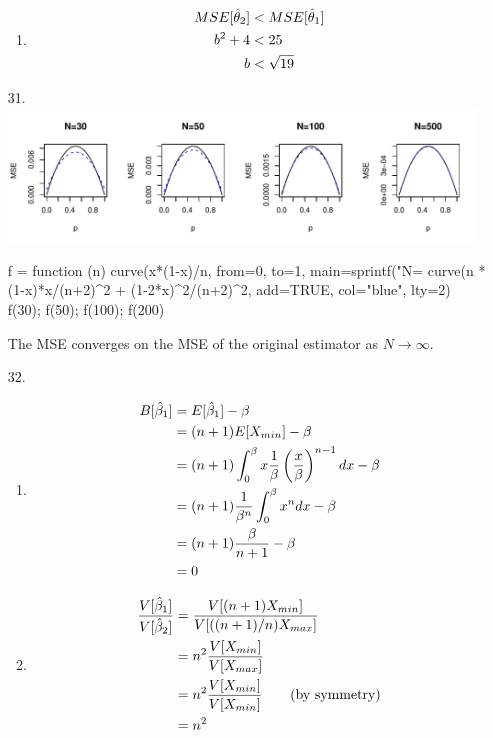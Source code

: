\documentclass{article}
\begin{document}
\begin{enumerate}
\begin{enumerate}
\item
\begin{align}
	MSE[\hat\theta_2] &< MSE[\hat\theta_1]
	\notag\\
	b^2 + 4 &< 25
	\notag\\
	b &< \sqrt{19}
	\notag
\end{align}
\end{enumerate}


\newpage
\item[31.]\hspace{0em}\\
\includegraphics[width=0.98\textwidth]{6-31.pdf}
\begin{code}
f = function (n) {
  curve(x*(1-x)/n, from=0, to=1, main=sprintf("N=%
  curve(n * (1-x)*x/(n+2)^2 + (1-2*x)^2/(n+2)^2, add=TRUE, col="blue", lty=2)
}
f(30); f(50); f(100); f(200)
\end{code}
The MSE converges on the MSE of the original estimator as $N \rightarrow \infty$.


\item[32.]
\begin{enumerate}
\item
\begin{align}
	B[\hat\beta_1] &= E[\hat\beta_1] - \beta \notag\\
	&= (n+1) E[X_{min}] - \beta \notag\\
	&= (n+1) \int_0^\beta x \dfrac{1}{\beta} \left(\dfrac{x}{\beta}\right)^{n-1} dx - \beta \notag\\
	&= (n+1) \dfrac{1}{\beta^n} \int_0^\beta x^n dx - \beta \notag\\
	&= (n+1) \dfrac{\beta}{n+1} - \beta \notag\\
	&= 0 \notag
\end{align}

\item
\begin{align}
	\dfrac{V[\hat\beta_1]}{V[\hat\beta_2]}
	&= \dfrac{V[(n+1)X_{min}]}{V[((n+1)/n)X_{max}]}
	\notag\\
	&= n^2 \dfrac{V[X_{min}]}{V[X_{max}]}
	\notag\\
	&= n^2 \dfrac{V[X_{min}]}{V[X_{min}]}
	\tag{\text{by symmetry}}
	\notag\\
	&= n^2
	\notag
\end{align}
\end{enumerate}



\end{enumerate}
\end{document}

